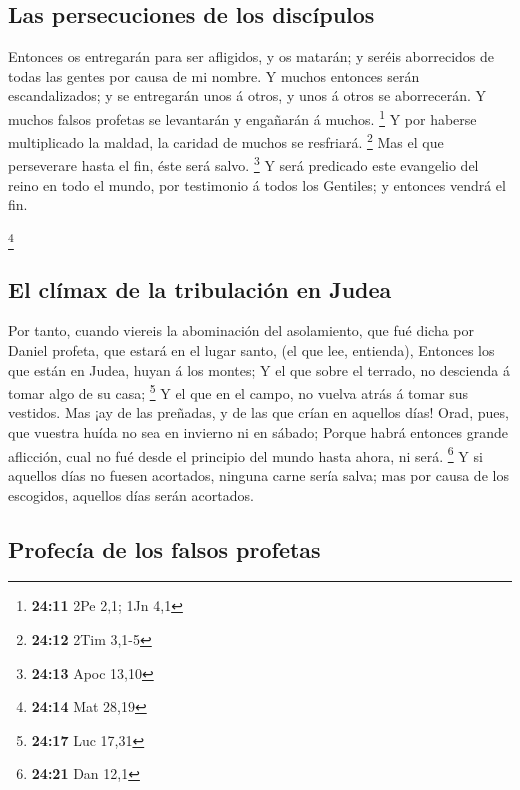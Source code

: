 \hypertarget{las-persecuciones-de-los-discuxedpulos}{%
\subsection{Las persecuciones de los
discípulos}\label{las-persecuciones-de-los-discuxedpulos}}

 Entonces os entregarán para ser afligidos, y os matarán; y
seréis aborrecidos de todas las gentes por causa de mi nombre.
 Y muchos entonces serán escandalizados; y se entregarán
unos á otros, y unos á otros se aborrecerán.  Y muchos
falsos profetas se levantarán y engañarán á muchos. \footnote{\textbf{24:11}
  2Pe 2,1; 1Jn 4,1}  Y por haberse multiplicado la maldad,
la caridad de muchos se resfriará. \footnote{\textbf{24:12} 2Tim 3,1-5}
 Mas el que perseverare hasta el fin, éste será salvo.
\footnote{\textbf{24:13} Apoc 13,10}  Y será predicado este
evangelio del reino en todo el mundo, por testimonio á todos los
Gentiles; y entonces vendrá el fin.

\footnote{\textbf{24:14} Mat 28,19}

\hypertarget{el-cluxedmax-de-la-tribulaciuxf3n-en-judea}{%
\subsection{El clímax de la tribulación en
Judea}\label{el-cluxedmax-de-la-tribulaciuxf3n-en-judea}}

 Por tanto, cuando viereis la abominación del asolamiento,
que fué dicha por Daniel profeta, que estará en el lugar santo, (el que
lee, entienda),  Entonces los que están en Judea, huyan á
los montes;  Y el que sobre el terrado, no descienda á
tomar algo de su casa; \footnote{\textbf{24:17} Luc 17,31} 
Y el que en el campo, no vuelva atrás á tomar sus vestidos.
 Mas ¡ay de las preñadas, y de las que crían en aquellos
días!  Orad, pues, que vuestra huída no sea en invierno ni
en sábado;  Porque habrá entonces grande aflicción, cual no
fué desde el principio del mundo hasta ahora, ni será. \footnote{\textbf{24:21}
  Dan 12,1}  Y si aquellos días no fuesen acortados,
ninguna carne sería salva; mas por causa de los escogidos, aquellos días
serán acortados.

\hypertarget{profecuxeda-de-los-falsos-profetas}{%
\subsection{Profecía de los falsos
profetas}\label{profecuxeda-de-los-falsos-profetas}}

